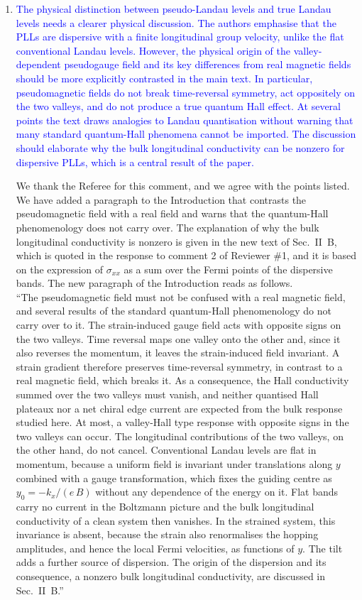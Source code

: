 \documentclass[aps,prb,onecolumn,nofootinbib,citeautoscript,10pt]{revtex4-2}
\begin{document}
\begin{enumerate}

\item \textcolor{blue}{The physical distinction between pseudo-Landau levels and true Landau levels needs a clearer physical discussion. The authors emphasise that the PLLs are dispersive with a finite longitudinal group velocity, unlike the flat conventional Landau levels. However, the physical origin of the valley-dependent pseudogauge field and its key differences from real magnetic fields should be more explicitly contrasted in the main text. In particular, pseudomagnetic fields do not break time-reversal symmetry, act oppositely on the two valleys, and do not produce a true quantum Hall effect. At several points the text draws analogies to Landau quantisation without warning that many standard quantum-Hall phenomena cannot be imported. The discussion should elaborate why the bulk longitudinal conductivity can be nonzero for dispersive PLLs, which is a central result of the paper.}

We thank the Referee for this comment, and we agree with the points listed. We have added a paragraph to the Introduction that contrasts the pseudomagnetic field with a real field and warns that the quantum-Hall phenomenology does not carry over. The explanation of why the bulk longitudinal conductivity is nonzero is given in the new text of Sec.~II~B, which is quoted in the response to comment 2 of Reviewer \#1, and it is based on the expression of $\sigma_{xx}$ as a sum over the Fermi points of the dispersive bands. The new paragraph of the Introduction reads as follows.\\``The pseudomagnetic field must not be confused with a real magnetic field, and several results of the standard quantum-Hall phenomenology do not carry over to it. The strain-induced gauge field acts with opposite signs on the two valleys. Time reversal maps one valley onto the other and, since it also reverses the momentum, it leaves the strain-induced field invariant. A strain gradient therefore preserves time-reversal symmetry, in contrast to a real magnetic field, which breaks it. As a consequence, the Hall conductivity summed over the two valleys must vanish, and neither quantised Hall plateaux nor a net chiral edge current are expected from the bulk response studied here. At most, a valley-Hall type response with opposite signs in the two valleys can occur. The longitudinal contributions of the two valleys, on the other hand, do not cancel. Conventional Landau levels are flat in momentum, because a uniform field is invariant under translations along $y$ combined with a gauge transformation, which fixes the guiding centre as $y_0=-k_x/(e\,B)$ without any dependence of the energy on it. Flat bands carry no current in the Boltzmann picture and the bulk longitudinal conductivity of a clean system then vanishes. In the strained system, this invariance is absent, because the strain also renormalises the hopping amplitudes, and hence the local Fermi velocities, as functions of $y$. The tilt adds a further source of dispersion. The origin of the dispersion and its consequence, a nonzero bulk longitudinal conductivity, are discussed in Sec.~II~B.''


\end{enumerate}
\end{document}
